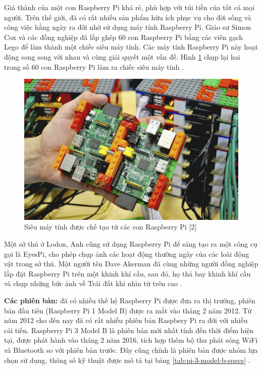\documentclass[12pt,a4paper,oneside]{extbook}
\begin{document}
Giá thành của một con Raspberry Pi khá rẻ, phù hợp với túi tiền của tất cả mọi người. Trên thế giới, đã có rất nhiều sản phẩm hữu ích phục vụ cho đời sống và công việc hằng ngày ra đời nhờ sử dụng máy tính Raspberry Pi. Giáo sư Simon Cox và các đồng nghiệp đã lắp ghép 60 con Raspberry Pi bằng các viên gạch Lego để làm thành một chiếc siêu máy tính. Các máy tính Raspberry Pi này hoạt động song song với nhau và cùng giải quyết một vấn đề. Hình \ref{fig:4-Sieu-may-tinh} chụp lại hai trong số 60 con Raspberry Pi làm ra chiếc siêu máy tính \cite{pi-for-dummies}.

\begin{figure}[h]
  \centering
     \includegraphics[scale=0.5]{4-Sieu-may-tinh}
  \caption{Siêu máy tính được chế tạo từ các con Raspberry Pi [2]}\label{fig:4-Sieu-may-tinh}
\end{figure}

Một sở thú ở Lodon, Anh cũng sử dụng Raspberry Pi để sáng tạo ra một công cụ gọi là EyesPi, cho phép chụp ảnh các hoạt động thường ngày của các loài động vật trong sở thú. Một người tên Dave Akerman đã cùng những người đồng nghiệp lắp đặt Raspberry Pi trên một khinh khí cầu, sau đó, họ thả bay khinh khí cầu và chụp những bức ảnh về Trái đất khi nhìn từ trên cao \cite{pi-for-dummies}.

\textbf{Các phiên bản:} đã có nhiều thế hệ Raspberry Pi được đưa ra thị trường, phiên bản đầu tiên (Raspberry Pi 1 Model B) được ra mắt vào tháng 2 năm 2012. Từ năm 2012 cho đến nay đã có rất nhiều phiên bản Raspbery Pi ra đời với nhiều cải tiến. Raspberry Pi 3 Model B là phiên bản mới nhất tính đến thời điểm hiện tại, được phát hành vào tháng 2 năm 2016, tích hợp thêm bộ thu phát sóng WiFi và Bluetooth so với phiên bản trước. Đây cũng chính là phiên bản được nhóm lựa chọn sử dụng, thông số kỹ thuật được mô tả tại bảng \ref{tab:pi-3-model-b-specs} \cite{pi-wiki}.
\end{document}
